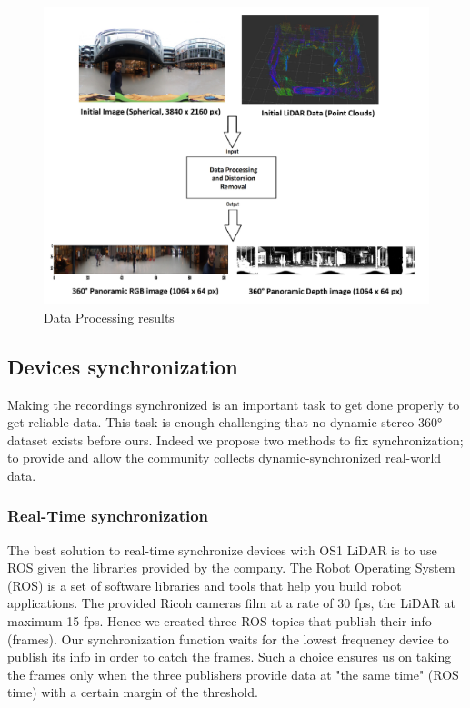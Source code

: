 \documentclass[english, LaM, oneside]{sapthesis}%
\begin{document}
\begin{figure}[h] %
    \centering
    \includegraphics[width=\linewidth]{Images/clear distorsion.png}
    \caption{Data Processing results}
    \label{fig:dataprocessing}
\end{figure}

\subsection{Devices synchronization}



Making the recordings synchronized is an important task to get done properly to get reliable data. This task is enough challenging that no dynamic stereo 360° dataset exists before ours. Indeed we propose two methods to fix synchronization; to provide and allow the community collects dynamic-synchronized real-world data.

\subsubsection{Real-Time synchronization} 

The best solution to real-time synchronize devices with OS1 LiDAR is to use ROS given the libraries provided by the company.
The Robot Operating System (ROS) is a set of software libraries and tools that help you build robot applications.
The provided Ricoh cameras film at a rate of 30 fps, the LiDAR at maximum 15 fps. 
Hence we created three ROS topics that publish their info (frames). Our synchronization function waits for the lowest frequency device to publish its info in order to catch the frames. Such a choice ensures us on taking the frames only when the three publishers provide data at "the same time" (ROS time) with a certain margin of the threshold.
\end{document}
